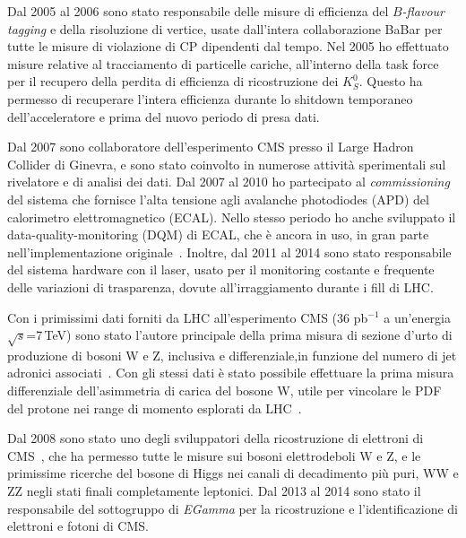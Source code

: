 \documentclass[11pt,twoside,a4paper]{article}
\begin{document}
Dal 2005 al 2006 sono stato responsabile delle misure di efficienza
del \textit{$B$-flavour tagging} e della risoluzione di vertice, usate
dall'intera collaborazione BaBar per tutte le misure di violazione di
CP dipendenti dal tempo. Nel 2005 ho effettuato misure relative al
tracciamento di particelle cariche, all'interno della task force per
il recupero della perdita di efficienza di ricostruzione dei
$K^0_S$. Questo ha permesso di recuperare l'intera efficienza durante
lo shitdown temporaneo dell'acceleratore e prima del nuovo periodo di
presa dati.

Dal 2007 sono collaboratore dell'esperimento CMS presso il Large
Hadron Collider di Ginevra, e sono stato coinvolto in numerose
attivit\`a sperimentali sul rivelatore e di analisi dei dati. Dal 2007
al 2010 ho partecipato al \textit{commissioning} del sistema che
fornisce l'alta tensione agli avalanche photodiodes (APD) del
calorimetro elettromagnetico (ECAL). Nello stesso periodo ho anche
sviluppato il data-quality-monitoring (DQM) di ECAL, che \`e ancora in
uso, in gran parte nell'implementazione
originale~\cite{DiMarco:2009zz}. Inoltre, dal 2011 al 2014 sono stato
responsabile del sistema hardware con il laser, usato per il
monitoring costante e frequente delle variazioni di trasparenza,
dovute all'irraggiamento durante i fill di LHC.

Con i primissimi dati forniti da LHC all'esperimento CMS (36 pb$^{-1}$
a un'energia $\sqrt{s}$=7\,TeV) sono stato l'autore principale della
prima misura di sezione d'urto di produzione di bosoni W e Z,
inclusiva e differenziale,in funzione del numero di jet adronici
associati~\cite{Chatrchyan:2011ne,Marco:2009dvd,Khachatryan:2010xn,CMS:2011aa}.
Con gli stessi dati \`e stato possibile effettuare la prima misura
differenziale dell'asimmetria di carica del bosone W, utile per
vincolare le PDF del protone nei range di momento esplorati da
LHC~\cite{Chatrchyan:2011jz}.

Dal 2008 sono stato uno degli sviluppatori della ricostruzione di
elettroni di CMS~\cite{Khachatryan:2015hwa}, che ha permesso tutte le
misure sui bosoni elettrodeboli W e Z, e le primissime ricerche del
bosone di Higgs nei canali di decadimento pi\`u puri, WW e ZZ negli
stati finali completamente leptonici. Dal 2013 al 2014 sono stato il
responsabile del sottogruppo di \textit{EGamma} per la ricostruzione e
l'identificazione di elettroni e fotoni di CMS.
\end{document}
